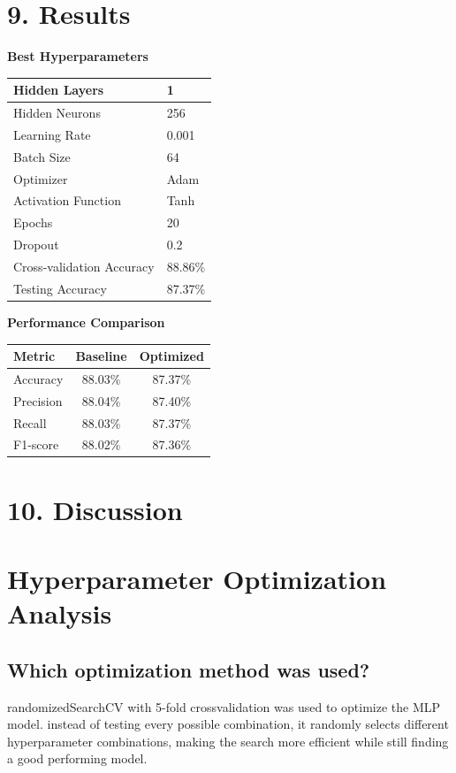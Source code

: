 \documentclass[11pt]{article}
\begin{document}
\section*{9. Results}

\textbf{Best Hyperparameters}

\begin{tabular}{|p{6cm}|p{6cm}|}
\hline
Hidden Layers & 1 \\\hline
Hidden Neurons & 256 \\\hline
Learning Rate & 0.001 \\\hline
Batch Size & 64 \\\hline
Optimizer & Adam \\\hline
Activation Function & Tanh \\\hline
Epochs & 20 \\\hline
Dropout & 0.2 \\\hline
Cross-validation Accuracy & 88.86\% \\\hline
Testing Accuracy & 87.37\% \\\hline
\end{tabular}

\vspace{3mm}

\textbf{Performance Comparison}
\begin{tabular}{|p{4cm}|c|c|}
\hline
Metric & Baseline & Optimized\\
\hline
Accuracy & 88.03\% & 87.37\% \\
Precision & 88.04\% & 87.40\% \\
Recall & 88.03\% & 87.37\% \\
F1-score & 88.02\% & 87.36\% \\
\hline
\end{tabular}
\section*{10. Discussion}

\section{Hyperparameter Optimization Analysis}

\subsection{Which optimization method was used?}

randomizedSearchCV with 5-fold crossvalidation was used to optimize the MLP model. 
instead of testing every possible combination, it randomly selects different hyperparameter 
combinations, making the search more efficient while still finding a good performing model.
\end{document}
